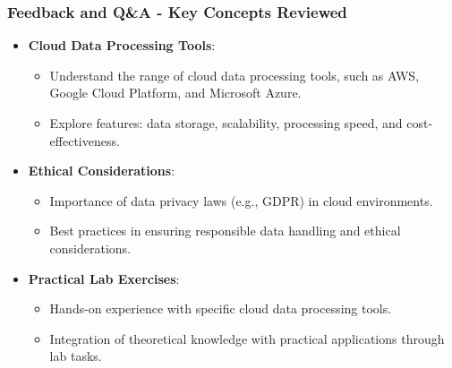 \documentclass[aspectratio=169]{beamer}
\begin{document}
\begin{frame}[fragile]
    \frametitle{Feedback and Q\&A - Key Concepts Reviewed}
    \begin{itemize}
        \item \textbf{Cloud Data Processing Tools}:
        \begin{itemize}
            \item Understand the range of cloud data processing tools, such as AWS, Google Cloud Platform, and Microsoft Azure.
            \item Explore features: data storage, scalability, processing speed, and cost-effectiveness.
        \end{itemize}
        
        \item \textbf{Ethical Considerations}:
        \begin{itemize}
            \item Importance of data privacy laws (e.g., GDPR) in cloud environments.
            \item Best practices in ensuring responsible data handling and ethical considerations.
        \end{itemize}
        
        \item \textbf{Practical Lab Exercises}:
        \begin{itemize}
            \item Hands-on experience with specific cloud data processing tools.
            \item Integration of theoretical knowledge with practical applications through lab tasks.
        \end{itemize}
    \end{itemize}
\end{frame}
\end{document}
